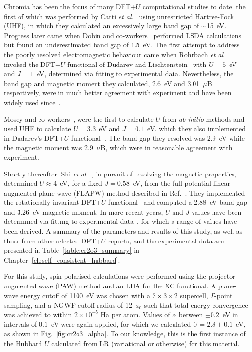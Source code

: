 Chromia has been the focus of 
many DFT+$U$ computational studies to date,
the first of which was performed 
by Catti {\it et al.}~\cite{CATTI19961735} 
using unrestricted Hartree-Fock (UHF), 
in which they calculated an excessively large 
band gap of $\sim$15~eV.
%
Progress later came when 
Dobin and co-workers~\cite{PhysRevB.62.11997} 
performed LSDA calculations 
but found an underestimated band gap of 1.5~eV.
%
The first attempt to address the poorly resolved 
electromagnetic behaviour came when 
Rohrbach {\it et al}~\cite{PhysRevB.70.125426,C0JM03852K} 
invoked the DFT+$U$ functional 
of Dudarev and Liechtenstein~\cite{PhysRevB.56.4900} 
with $U=5$~eV and $J=1$~eV, 
determined via fitting to experimental data.
%
Nevertheless, 
the band gap and magnetic moment they calculated, 
2.6~eV and 3.01~$\mu$B, respectively, 
were in much better agreement with experiment 
and have been widely used since~\cite{doi:10.1021/jp5039943,Mosey2009287,doi:10.1021/jp5039943}.

Mosey and co-workers~\cite{PhysRevB.76.155123,doi:10.1063/1.4865780,doi:10.1063/1.2943142,Mosey2009287}, 
were the first to calculate $U$ from {\it ab initio} methods 
and used UHF to calculate $U=3.3$~eV and $J=0.1$~eV, 
which they also implemented in Dudarev's 
DFT+$U$ functional~\cite{PhysRevB.56.4900}.
%
The band gap they resolved was 2.9~eV 
while the magnetic moment was 2.9~$\mu$B, 
which were in reasonable agreement with experiment.
%

Shortly thereafter, 
Shi {\it et al.}~\cite{PhysRevB.79.104404}, 
in pursuit of resolving the magnetic properties,
determined $U\approx4$~eV, for a fixed $J=0.58$~eV,  
from the full-potential linear augmented plane-wave (FLAPW) 
method described in Ref.~\cite{blugel2006computational}.
%
They implemented the 
rotationally invariant DFT+$U$ functional~\cite{PhysRevB.52.R5467,0953-8984-9-35-010,PhysRevB.71.035105} 
and computed a 2.88~eV band gap 
and 3.26~eV magnetic moment.
%
In more recent years, 
$U$ and $J$ values have been 
determined via fitting 
to experimental data~\cite{PhysRevB.73.195107,0953-8984-28-12-125501,Wang20121422,doi:10.1063/1.4970882,doi:10.1021/acs.jpcc.6b05575,PhysRevB.87.195124}, 
for which a range of values have been derived.
%
A summary of the parameters and results of this study, 
as well as those from other selected DFT+$U$ reports, 
and the experimental data 
are presented in Table~\ref{table:cr2o3_summary} 
in Chapter~\ref{ch:self_consistent_hubbard}.

For this study, 
spin-polarised calculations were performed using the\break 
projector-augmented wave (PAW) method 
and an LDA for the XC functional. 
%
A plane-wave energy cutoff of 1100~eV 
was chosen with a $3\times3\times2$ supercell, 
$\Gamma$-point sampling, 
and a NGWF cutoff radius of 12~$a_0$ 
such that total-energy  convergence was achieved to 
within $2\times10^{-5}$ Ha per atom.
%
Values of $\alpha$ between $\pm0.2$~eV 
in intervals of $0.1$~eV were again applied, 
for which we calculated $U=2.8\pm0.1$~eV, 
as shown in Fig.~\ref{fig:cr2o3_alpha}.
%
To our knowledge, this is the first
instance of the Hubbard $U$ calculated 
from LR (variational or otherwise) for this material. 
%

